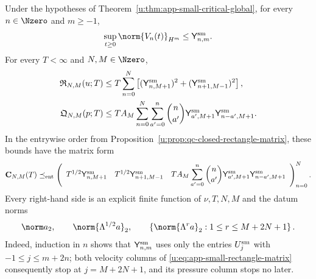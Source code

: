 \begin{proposition}
\label{u:prop:app-small-data-rectangles}
Under the hypotheses of Theorem~\ref{u:thm:app-small-critical-global}, for
every \(n\in\Nzero\) and \(m\ge-1\),
\begin{equation}
 \sup_{t\ge0}\norm{V_n(t)}_{H^m}
 \le\mathsf Y_{n,m}^{\rm sm}.
 \label{u:eq:app-small-time-row}
\end{equation}
For every \(T<\infty\) and \(N,M\in\Nzero\),
\begin{align}
 \mathfrak R_{N,M}(u;T)
 &\le
 T\sum_{n=0}^{N}
 \left[
 (\mathsf Y_{n,M+1}^{\rm sm})^2
 +(\mathsf Y_{n+1,M-1}^{\rm sm})^2
 \right],
 \label{u:eq:app-small-rectangle}\\
 \mathfrak Q_{N,M}(p;T)
 &\le
 TA_M\sum_{n=0}^{N}\sum_{a'=0}^{n}\binom n{a'}
 \mathsf Y_{a',M+1}^{\rm sm}
 \mathsf Y_{n-a',M+1}^{\rm sm}.
 \label{u:eq:app-small-pressure-rectangle}
\end{align}
In the entrywise order from
Proposition~\ref{u:prop:qc-closed-rectangle-matrix}, these bounds have the
matrix form
\begin{equation}
 \mathbf C_{N,M}(T)
 \preceq_{\rm ent}
 \left(
 \begin{array}{ccc}
  T^{1/2}\mathsf Y_{n,M+1}^{\rm sm}
  &T^{1/2}\mathsf Y_{n+1,M-1}^{\rm sm}
  &TA_M\displaystyle\sum_{a'=0}^{n}\binom n{a'}
    \mathsf Y_{a',M+1}^{\rm sm}
    \mathsf Y_{n-a',M+1}^{\rm sm}
 \end{array}
 \right)_{n=0}^{N}.
 \label{u:eq:app-small-rectangle-matrix}
\end{equation}
Every right-hand side is an explicit finite function of \(\nu,T,N,M\) and
the datum norms
\begin{equation}
 \norm a_2,\qquad
 \norm{\Lambda^{1/2}a}_2,\qquad
 \left\{\norm{\Lambda^ra}_2:
  1\le r\le M+2N+1\right\}.
 \label{u:eq:app-small-data-derivative-ceiling}
\end{equation}
Indeed, induction in \(n\) shows that
\(\mathsf Y_{n,m}^{\rm sm}\) uses only the entries
\(U_j^{\rm sm}\) with \(-1\le j\le m+2n\); both velocity columns of
\eqref{u:eq:app-small-rectangle-matrix} consequently stop at
\(j=M+2N+1\), and its pressure column stops no later.
\end{proposition}

